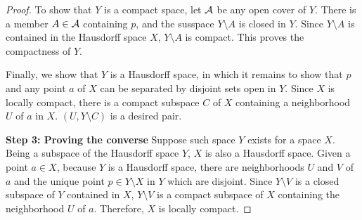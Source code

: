 \begin{proof}
    To show that $Y$ is a compact space, let ${\mathcal{A}}$ be any open cover of $Y$.
    There is a member $A\in{\mathcal{A}}$ containing $p$, and the susspace $Y\setminus A$ is closed in $Y$.
    Since $Y\setminus A$ is contained in the Hausdorff space $X$, $Y\setminus A$ is compact.
    This proves the compactness of $Y$.

    Finally, we show that $Y$ is a Hausdorff space, in which it remains to show that $p$ and any point $a$ of $X$ can be separated by disjoint sets open in $Y$.
    Since $X$ is locally compact, there is a compact subspace $C$ of $X$ containing a neighborhood $U$ of $a$ in $X$.
    $(U, Y\setminus C)$ is a desired pair.

    \textbf{Step 3: Proving the converse}\newline\noindent
    Suppose such space $Y$ exists for a space $X$.
    Being a subspace of the Hausdorff space $Y$, $X$ is also a Hausdorff space.
    Given a point $a\in X$, because $Y$ is a Hausdorff space, there are neighborhoods $U$ and $V$ of $a$ and the unique point $p\in Y\setminus X$ in $Y$ which are disjoint.
    Since $Y\setminus V$ is a closed subspace of $Y$ contained in $X$, $Y\setminus V$ is a compact subspace of $X$ containing the neighborhood $U$ of $a$.
    Therefore, $X$ is locally compact.
\end{proof}

